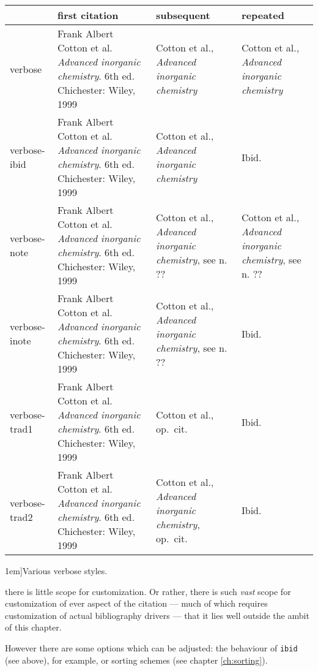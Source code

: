 \begin{table*}[btp]
\small
\begin{tabular}{lp{1.7in}p{1.7in}p{1.7in}}
\toprule
                                               & \textsf{first citation} & \textsf{subsequent} & 
\textsf{repeated}                                      \\
\midrule verbose                               & Frank Albert Cotton et al. \emph{Advanced inorganic
  chemistry}. 6th ed. Chichester: Wiley, 1999  & Cotton et al.,
\emph{Advanced inorganic chemistry}            & Cotton et al., \emph{Advanced
  inorganic chemistry}                                 \\
verbose-ibid                                   & Frank Albert Cotton et al. \emph{Advanced inorganic
  chemistry}. 6th ed. Chichester: Wiley, 1999  & Cotton et al.,
\emph{Advanced inorganic chemistry}            & Ibid. \\
verbose-note                                   & Frank Albert Cotton et al. \emph{Advanced inorganic
  chemistry}. 6th ed. Chichester: Wiley, 1999  & Cotton et al.,
\emph{Advanced inorganic chemistry}, see n. ?? & Cotton et al.,
\emph{Advanced inorganic chemistry}, see n. ??         \\
verbose-inote                                  & Frank Albert Cotton et al. \emph{Advanced inorganic
  chemistry}. 6th ed. Chichester: Wiley, 1999  & Cotton et al.,
\emph{Advanced inorganic chemistry}, see n. ?? & Ibid. \\
verbose-trad1                                  & Frank Albert Cotton et al. \emph{Advanced inorganic
  chemistry}. 6th ed. Chichester: Wiley, 1999  & Cotton et al.,
op.\ cit.                                      & Ibid. \\
verbose-trad2                                  & Frank Albert Cotton et al. \emph{Advanced inorganic
  chemistry}. 6th ed. Chichester: Wiley, 1999  & Cotton et al.,
\emph{Advanced inorganic chemistry},
op.\ cit.                                      & Ibid. \\
\bottomrule
\end{tabular}
\caption[][1em]{Various verbose styles.\label{bibliography:examples:verbose}}
\end{table*}

 there is little scope for
customization. Or rather, there is such \emph{vast} scope for
customization of ever aspect of the citation --- much of which
requires customization of actual bibliography drivers --- that it lies
well outside the ambit of this chapter.

However there are some options which can be adjusted: the behaviour of
\verb|ibid| (see above), for example, or sorting schemes (see chapter
\ref{ch:sorting}).

